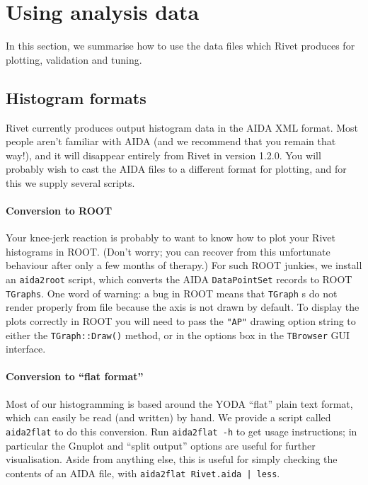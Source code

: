 \documentclass{JHEP3}
\newcommand{\kbd}[1]{\texttt{#1}\xspace}
\begin{document}
\section{Using analysis data}

In this section, we summarise how to use the data files which Rivet produces for
plotting, validation and tuning.


\subsection{Histogram formats}

Rivet currently produces output histogram data in the AIDA XML format. Most
people aren't familiar with AIDA (and we recommend that you remain that way!),
and it will disappear entirely from Rivet in version 1.2.0. You will probably
wish to cast the AIDA files to a different format for plotting, and for this we
supply several scripts.

\paragraph{Conversion to ROOT}
Your knee-jerk reaction is probably to want to know how to plot your Rivet
histograms in ROOT. (Don't worry; you can recover from this unfortunate
behaviour after only a few months of therapy.) For such ROOT junkies, we install
an \kbd{aida2root} script, which converts the AIDA \kbd{DataPointSet} records to
ROOT \kbd{TGraphs}. One word of warning: a bug in ROOT means that \kbd{TGraph}s
do not render properly from file because the axis is not drawn by default. To
display the plots correctly in ROOT you will need to pass the \kbd{"AP"} drawing
option string to either the \kbd{TGraph::Draw()} method, or in the options box
in the \kbd{TBrowser} GUI interface.

\paragraph{Conversion to ``flat format''}
Most of our histogramming is based around the YODA ``flat'' plain text format,
which can easily be read (and written) by hand. We provide a script called
\kbd{aida2flat} to do this conversion. Run \kbd{aida2flat -h} to get usage
instructions; in particular the Gnuplot and ``split output'' options are useful
for further visualisation. Aside from anything else, this is useful for simply
checking the contents of an AIDA file, with \kbd{aida2flat Rivet.aida | less}.
\end{document}
